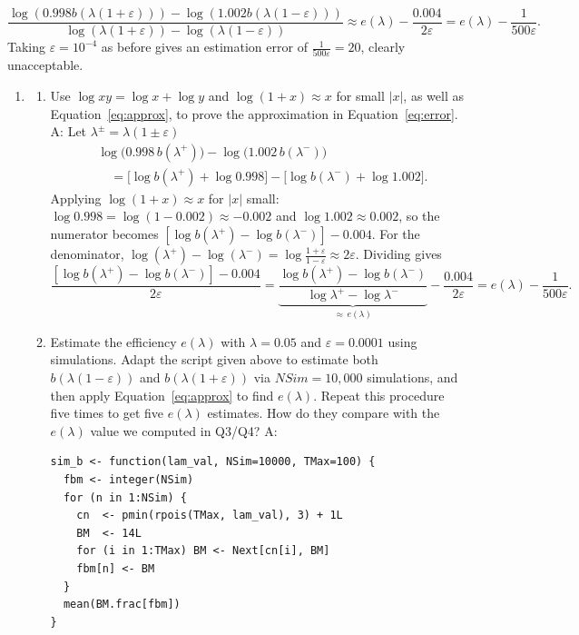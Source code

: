 \documentclass{article}
\begin{document}
\begin{equation}
\frac{\log (0.998 b(\lambda(1 + \varepsilon))) - \log (1.002 b(\lambda(1 - \varepsilon)))}{\log(\lambda(1 + \varepsilon)) - \log(\lambda(1 - \varepsilon))} \approx e(\lambda) - \frac{0.004}{2\varepsilon} = e(\lambda) - \frac{1}{500\varepsilon}. \label{eq:error}
\end{equation}
Taking $\varepsilon = 10^{-4}$ as before gives an estimation error of $\frac{1}{500\varepsilon} = 20$, clearly unacceptable.
 
\begin{enumerate}
  \item [$\boldsymbol{Q}_6$]
  \begin{enumerate}
    \item [(a)] Use $\log xy = \log x + \log y$ and $\log(1 + x) \approx x$ for small $|x|$, as well as Equation~\ref{eq:approx}, to prove the approximation in Equation~\ref{eq:error}. \newline
    A:
    Let $\lambda^{\pm} = \lambda(1 \pm \varepsilon)$
    \begin{align*}
      &\log\!\bigl(0.998\,b(\lambda^+)\bigr) - \log\!\bigl(1.002\,b(\lambda^-)\bigr) \\
      &\quad= \bigl[\log b(\lambda^+) + \log 0.998\bigr] - \bigl[\log b(\lambda^-) + \log 1.002\bigr].
    \end{align*}
    Applying $\log(1+x) \approx x$ for $|x|$ small: $\log 0.998 = \log(1-0.002) \approx -0.002$ and $\log 1.002 \approx 0.002$, so the numerator becomes $[\log b(\lambda^+) - \log b(\lambda^-)] - 0.004$. For the denominator, $\log(\lambda^+) - \log(\lambda^-) = \log\!\frac{1+\varepsilon}{1-\varepsilon} \approx 2\varepsilon$. Dividing gives
    \[
      \frac{[\log b(\lambda^+) - \log b(\lambda^-)] - 0.004}{2\varepsilon}
      = \underbrace{\frac{\log b(\lambda^+) - \log b(\lambda^-)}{\log \lambda^+ - \log \lambda^-}}_{\approx\, e(\lambda)} - \frac{0.004}{2\varepsilon}
      = e(\lambda) - \frac{1}{500\varepsilon}.
    \] \clearpage
    \item [(b)] Estimate the efficiency $e(\lambda)$ with $\lambda = 0.05$ and $\varepsilon = 0.0001$ using simulations. Adapt the script given above to estimate both $b(\lambda(1-\varepsilon))$ and $b(\lambda(1+\varepsilon))$ via $NSim = 10,000$ simulations, and then apply Equation~\ref{eq:approx} to find $e(\lambda)$. Repeat this procedure five times to get five $e(\lambda)$ estimates. How do they compare with the $e(\lambda)$ value we computed in Q3/Q4? \newline
    A:
\begin{lstlisting}
sim_b <- function(lam_val, NSim=10000, TMax=100) {
  fbm <- integer(NSim)
  for (n in 1:NSim) {
    cn  <- pmin(rpois(TMax, lam_val), 3) + 1L
    BM  <- 14L
    for (i in 1:TMax) BM <- Next[cn[i], BM]
    fbm[n] <- BM
  }
  mean(BM.frac[fbm])
}


\end{lstlisting}
\end{enumerate}
\end{enumerate}
\end{document}
